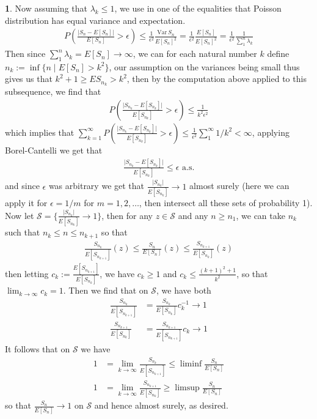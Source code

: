 \documentclass[10.5pt]{article}
\theoremstyle{definition}
\newtheorem{pb}{}
\newcommand{\set}[1]{\{#1\}}
\newcommand{\abs}[1]{\lvert#1\rvert}
\begin{document}
\begin{pb}
        Now assuming that \(\lambda_k \leq 1\), we use in one of the equalities that Poisson distribution has equal variance and expectation.
        \begin{align*}
            P\left(\frac{\abs{S_{n} - E[S_{n}]}}{E[S_n]} > \epsilon\right) \leq \frac{1}{\epsilon^2}\frac{\text{Var}\,S_n}{E[S_n]^2} = \frac{1}{\epsilon^2}\frac{E[S_n]}{E[S_n]^2} = \frac{1}{\epsilon^2}\frac{1}{\sum_1^n \lambda_k}
        \end{align*}
        Then since \(\sum_1^n \lambda_k = E[S_n] \to \infty\), we can for each natural number \(k\) define \(n_k := \inf\set{n \mid E[S_n] > k^2}\), our assumption on the variances being small thus gives us that \(k^2 + 1 \geq E S_{n_k} > k^2\), then by the computation above applied to this subsequence, we find that
        \begin{align*}
            P\left(\frac{\abs{S_{n_k} - E[S_{n_k}]}}{E[S_{n_k}]} > \epsilon\right) \leq \frac{1}{k^2 \epsilon^2}
        \end{align*}
        which implies that \(\sum_{k=1}^\infty P\left(\frac{\abs{S_{n_k} - E[S_{n_k}]}}{E[S_{n_k}]} > \epsilon\right) \leq \frac{1}{\epsilon^2}\sum_1^\infty 1/k^2 < \infty\), applying Borel-Cantelli we get that
        \begin{align*}
            \frac{\abs{S_{n_k} - E[S_{n_k}]}}{E[S_{n_k}]} \leq \epsilon \text{ a.s.}
        \end{align*}
        and since \(\epsilon\) was arbitrary we get that \(\frac{\abs{S_{n_k}}}{E[S_{n_k}]} \to 1\) almost surely (here we can apply it for \(\epsilon = 1/m\) for \(m = 1,2,\hdots\), then intersect all these sets of probability 1). Now let \(\mathcal{S} = \set{\frac{\abs{S_{n_k}}}{E[S_{n_k}]} \to 1}\), then for any \(z \in \mathcal{S}\) and any \(n \geq n_1\), we can take \(n_k\) such that \(n_k \leq n \leq n_{k+1}\) so that
        \begin{align*}
            \frac{S_{n_k}}{E[S_{n_{k+1}}]}(z) \leq \frac{S_n}{E[S_n]}(z) \leq \frac{S_{n_{k+1}}}{E[S_{n_k}]}(z)
        \end{align*}
        then letting \(c_k := \frac{E[S_{n_{k+1}}]}{E[S_{n_{k}}]}\), we have \(c_k \geq 1\) and \(c_k \leq \frac{(k+1)^2 + 1}{k^2}\), so that \(\lim_{k\to \infty}c_k = 1\). Then we find that on \(\mathcal{S}\), we have both
        \begin{align*}
            \frac{S_{n_k}}{E[S_{n_{k+1}}]} &= \frac{S_{n_k}}{E[S_{n_k}]}c_k^{-1} \to 1 \\
            \frac{S_{n_{k+1}}}{E[S_{n_{k}}]} &= \frac{S_{n_{k+1}}}{E[S_{n_{k+1}}]}c_k \to 1
        \end{align*}
        It follows that on \(\mathcal{S}\) we have
        \begin{align*}
            1 &= \lim_{k\to\infty}\frac{S_{n_k}}{E[S_{n_{k+1}}]} \leq \liminf \frac{S_n}{E[S_n]} \\
            1 &= \lim_{k\to\infty}\frac{S_{n_{k+1}}}{E[S_{n_{k}}]} \geq \limsup \frac{S_n}{E[S_n]}
        \end{align*}
        so that \(\frac{S_n}{E[S_n]} \to 1\) on \(\mathcal{S}\) and hence almost surely, as desired.


\end{pb}
\end{document}
